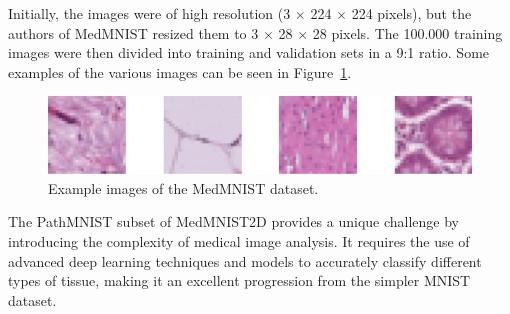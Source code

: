 Initially, the images were of high resolution (3 $\times$ 224 $\times$ 224 pixels), but the authors of MedMNIST resized them to 3 $\times$ 28 $\times$ 28 pixels. The 100.000 training images were then divided into training and validation sets in a 9:1 ratio. Some examples of the various images can be seen in Figure~\ref{fig:MedMNIST}.

\begin{figure}
    \centering
    \includegraphics[width=1\textwidth]{figures/MedMNIST.png}
    \caption{Example images of the MedMNIST dataset.}\label{fig:MedMNIST}
\end{figure}


The PathMNIST subset of MedMNIST2D provides a unique challenge by introducing the complexity of medical image analysis. It requires the use of advanced deep learning techniques and models to accurately classify different types of tissue, making it an excellent progression from the simpler MNIST dataset.
